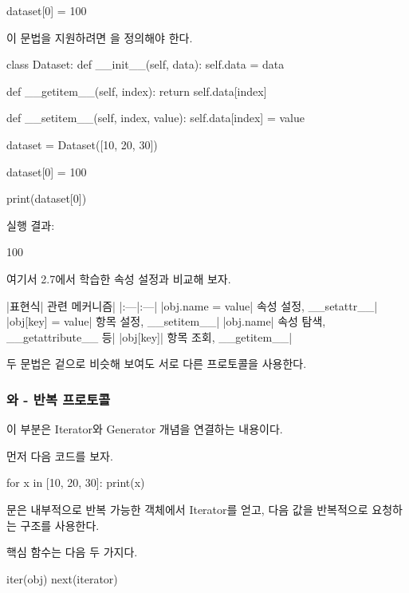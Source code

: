 \begin{dhkcode}
dataset[0] = 100
\end{dhkcode}

이 문법을 지원하려면 을 정의해야 한다.

\begin{dhkcode}
class Dataset:
    def __init__(self, data):
        self.data = data

    def __getitem__(self, index):
        return self.data[index]

    def __setitem__(self, index, value):
        self.data[index] = value

dataset = Dataset([10, 20, 30])

dataset[0] = 100

print(dataset[0])
\end{dhkcode}

실행 결과:

\begin{dhkzsh}
100
\end{dhkzsh}

여기서 2.7에서 학습한 속성 설정과 비교해 보자.

\begin{dhktable}
|표현식|	관련 메커니즘|
|:---|:---|
|obj.name = value|	속성 설정, __setattr__|
|obj[key] = value|	항목 설정, __setitem__|
|obj.name|	속성 탐색, __getattribute__ 등|
|obj[key]|	항목 조회, __getitem__|
\end{dhktable}

두 문법은 겉으로 비슷해 보여도 서로 다른 프로토콜을 사용한다.

\subsubsection{와  - 반복 프로토콜}

이 부분은 Iterator와 Generator 개념을 연결하는 내용이다.

먼저 다음 코드를 보자.

\begin{dhkcode}
for x in [10, 20, 30]:
    print(x)
\end{dhkcode}

문은 내부적으로 반복 가능한 객체에서 Iterator를 얻고, 다음 값을 반복적으로 요청하는 구조를 사용한다.

핵심 함수는 다음 두 가지다.

\begin{dhkcode}
iter(obj)
next(iterator)
\end{dhkcode}

